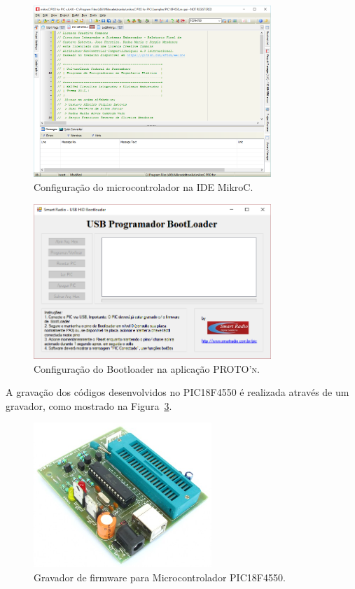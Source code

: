 \documentclass[
	12pt,				%
	openright,			%
  oneside,     %
	a4paper,			%
	english,			%
	french,				%
	spanish,			%
	brazil				%
	]{abntex2}
\begin{document}
\begin{figure}[ht]
  \centering
  \caption{\label{fig:cha-3-mikroC-Pro01}Configuração do microcontrolador na IDE MikroC.}
  \includegraphics[width=0.8\textwidth]{images/Atividade03/mikroC-PRO00.png}
\end{figure}

\begin{figure}[ht]
  \centering
  \caption{\label{fig:cha-3-PROTOn-BOOTLOADER}Configuração do Bootloader na aplicação \textsc{PROTO'n}.}
  \includegraphics[width=0.8\textwidth]{images/Atividade03/PROTOn-BOOTLOADER.png}
\end{figure}

A gravação dos códigos desenvolvidos no PIC18F4550 é realizada através de um gravador, como mostrado na Figura~\ref{fig:04GravadorPIC}.

\begin{figure}[ht]
  \centering
  \caption{\label{fig:04GravadorPIC}Gravador de firmware para Microcontrolador PIC18F4550.}
  \includegraphics[width=0.6\textwidth]{images/Atividade03/04GravadorPIC.jpg}
\end{figure}
\end{document}
